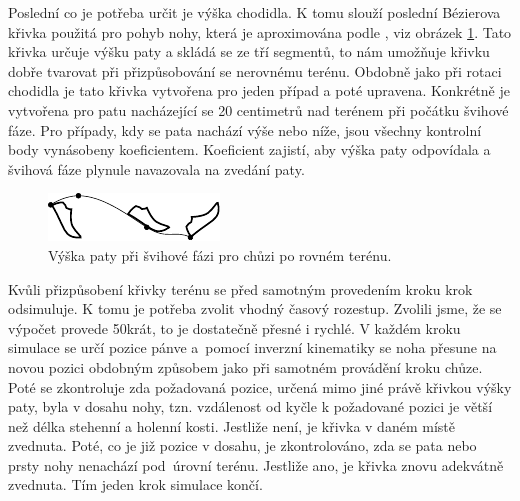 Poslední co je potřeba určit je výška chodidla. K tomu slouží poslední Bézierova křivka použitá pro pohyb nohy, která je aproximována podle \cite{DadashiMarianiRochatEtAl2014}, viz obrázek \ref{fig:swingHeight}. Tato křivka určuje výšku paty a skládá se ze tří segmentů, to nám umožňuje křivku dobře tvarovat při přizpůsobování se nerovnému terénu. Obdobně jako při rotaci chodidla je tato křivka vytvořena pro jeden případ a poté upravena. Konkrétně je vytvořena pro patu nacházející se 20 centimetrů nad terénem při počátku švihové fáze. Pro případy, kdy se pata nachází výše nebo níže, jsou všechny kontrolní body vynásobeny koeficientem. Koeficient zajistí, aby výška paty odpovídala a švihová fáze plynule navazovala na zvedání paty.

\begin{figure}[h]
	\centering
	\includegraphics[width=0.5\linewidth]{fig/legSwingCurve_excel.pdf}
	\caption{Výška paty při švihové fázi pro chůzi po rovném terénu.}
	\label{fig:swingHeight}
\end{figure}

Kvůli přizpůsobení křivky terénu se před samotným provedením kroku krok odsimuluje. K tomu je potřeba zvolit vhodný časový rozestup. Zvolili jsme, že se výpočet provede 50krát, to je dostatečně přesné i rychlé. V každém kroku simulace se určí pozice pánve a~pomocí inverzní kinematiky se noha přesune na novou pozici obdobným způsobem jako při samotném provádění kroku chůze. Poté se zkontroluje zda požadovaná pozice, určená mimo jiné právě křivkou výšky paty, byla v dosahu nohy, tzn. vzdálenost od kyčle k požadované pozici je větší než délka stehenní a holenní kosti. Jestliže není, je křivka v daném místě zvednuta. Poté, co je již pozice v dosahu, je zkontrolováno, zda se pata nebo prsty nohy nenachází pod~úrovní terénu. Jestliže ano, je křivka znovu adekvátně zvednuta. Tím jeden krok simulace končí.

